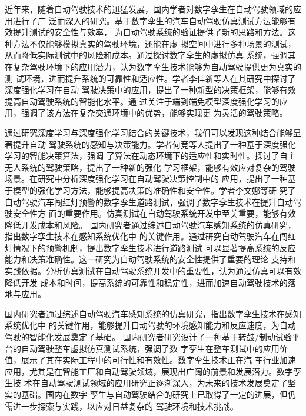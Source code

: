 近年来，随着自动驾驶技术的迅猛发展，国内学者对数字孪生在自动驾驶领域的应用进行了广
泛而深入的研究。基于数字孪生的汽车自动驾驶仿真测试方法能够有效提升测试的安全性与效率，
为自动驾驶系统的验证提供了新的思路和方法。这种方法不仅能够模拟真实的驾驶环境，还能在虚
拟空间中进行多种场景的测试，从而降低实际测试中的风险和成本\cite{文谢2023基于数字孪生的汽车自动驾驶仿真测试方法}。通过探讨数字孪生的虚拟仿真
系统，强调其在复杂驾驶环境下的应用潜力，认为数字孪生技术能够为自动驾驶提供更为真实的测
试环境，进而提升系统的可靠性和适应性\cite{彭博2023基于数字孪生的虚拟仿真系统研究与应用}。学者李佳新等人在其研究中探讨了深度强化学习在自动
驾驶决策中的应用，提出了一种新型的决策框架，能够有效提高自动驾驶系统的智能化水平。通
过关注于端到端免模型深度强化学习的应用，强调了该方法在复杂交通环境中的优势，能够实现更
为灵活的驾驶策略。

通过研究深度学习与深度强化学习结合的关键技术，我们可以发现这种结合能够显著提升自动
驾驶系统的感知与决策能力。学者何竞等人提出了一种基于深度强化学习的智能决策算法，强调
了算法在动态环境下的适应性和实时性。探讨了自主无人系统的驾驶策略，提出了一种新的强化
学习框架，能够有效应对复杂的驾驶场景。在研究中分析深度强化学习在自动驾驶决策控制中的
应用，提出了一种基于模型的强化学习方法，能够提高决策的准确性和安全性。学者李文娜\cite{李文娜2024自动驾驶汽车闯红灯预警数字孪生道路测试}等研
究了自动驾驶汽车闯红灯预警的数字孪生道路测试，强调了数字孪生技术在提升自动驾驶安全性方
面的重要作用。仿真测试在自动驾驶系统开发中至关重要，能够有效降低开发成本和风险。
国内研究者通过综述自动驾驶汽车感知系统的仿真研究，指出数字孪生技术在感知系统优化中
的关键作用。通过研究自动驾驶汽车在闯红灯情况下的预警机制，提出数字孪生技术进行道路测试
可以显著提高系统的反应能力和决策准确性。这一研究为自动驾驶系统的安全性提供了重要的理论
支持和实践依据。分析仿真测试在自动驾驶系统开发中的重要性，认为通过仿真可以有效降低开发
成本和时间，提高系统的可靠性和稳定性，进而加速自动驾驶技术的落地与应用\cite{杨海清2024仿真测试在自动驾驶系统开发中的重要性}。

国内研究者通过综述自动驾驶汽车感知系统的仿真研究，指出数字孪生技术在感知系统优化中
的关键作用，能够提升自动驾驶的环境感知能力和反应速度，为自动驾驶的智能化发展奠定了基础\cite{杨海清2024仿真测试在自动驾驶系统开发中的重要性}。
国内研究者研究设计了一种基于转鼓/制动试验平台的自动驾驶整车虚拟仿真测试系统\cite{田常青2024基于转鼓}，强调了数
字孪生在整车测试中的应用价值，展示了其在实际工程中的可行性和有效性。数字孪生技术正在汽
车行业加速应用，尤其是在智能工厂和自动驾驶领域，展现出广阔的前景和发展潜力\cite{高驰2023智能工厂}。数字孪生技
术在自动驾驶测试领域的应用研究正逐渐深入，为未来的技术发展奠定了坚实的基础。国内在数字
孪生与自动驾驶结合的研究上已取得了一定的进展，但仍需进一步探索与实践，以应对日益复杂的
驾驶环境和技术挑战。

